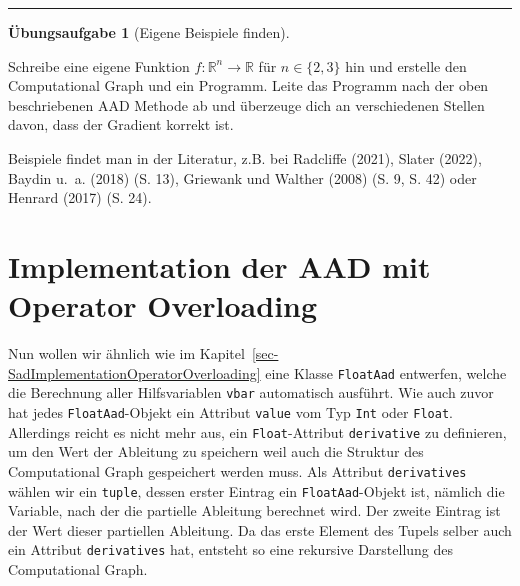 \documentclass[
  a4paper,
  DIV=11]{scrreprt}
\theoremstyle{definition}
\newtheorem{exercise}{Übungsaufgabe}[chapter]
\theoremstyle{definition}
\theoremstyle{remark}
\begin{document}
\begin{center}\rule{0.5\linewidth}{0.5pt}\end{center}

\begin{exercise}[Eigene Beispiele
finden]\protect\hypertarget{exr-EigeneAADBeispiele1}{}\label{exr-EigeneAADBeispiele1}

Schreibe eine eigene Funktion
\(f : \mathbb{R}^n \rightarrow \mathbb{R}\) für
\(n\in\lbrace 2, 3 \rbrace\) hin und erstelle den Computational Graph
und ein Programm. Leite das Programm nach der oben beschriebenen AAD
Methode ab und überzeuge dich an verschiedenen Stellen davon, dass der
Gradient korrekt ist.

\end{exercise}

\begin{tcolorbox}[enhanced jigsaw, titlerule=0mm, title=\textcolor{quarto-callout-tip-color}{\faLightbulb}\hspace{0.5em}{Lösung}, breakable, coltitle=black, leftrule=.75mm, bottomrule=.15mm, colback=white, rightrule=.15mm, opacitybacktitle=0.6, bottomtitle=1mm, toptitle=1mm, left=2mm, toprule=.15mm, colbacktitle=quarto-callout-tip-color!10!white, colframe=quarto-callout-tip-color-frame, arc=.35mm, opacityback=0]

Beispiele findet man in der Literatur, z.B. bei Radcliffe (2021), Slater
(2022), Baydin u.~a. (2018) (S. 13), Griewank und Walther (2008) (S. 9,
S. 42) oder Henrard (2017) (S. 24).

\end{tcolorbox}

\hypertarget{sec-AADmitOperatorOverloading}{%
\section{Implementation der AAD mit Operator
Overloading}\label{sec-AADmitOperatorOverloading}}

Nun wollen wir ähnlich wie im
Kapitel~\ref{sec-SadImplementationOperatorOverloading} eine Klasse
\texttt{FloatAad} entwerfen, welche die Berechnung aller Hilfsvariablen
\texttt{vbar} automatisch ausführt. Wie auch zuvor hat jedes
\texttt{FloatAad}-Objekt ein Attribut \texttt{value} vom Typ
\texttt{Int} oder \texttt{Float}. Allerdings reicht es nicht mehr aus,
ein \texttt{Float}-Attribut \texttt{derivative} zu definieren, um den
Wert der Ableitung zu speichern weil auch die Struktur des Computational
Graph gespeichert werden muss. Als Attribut \texttt{derivatives} wählen
wir ein \texttt{tuple}, dessen erster Eintrag ein
\texttt{FloatAad}-Objekt ist, nämlich die Variable, nach der die
partielle Ableitung berechnet wird. Der zweite Eintrag ist der Wert
dieser partiellen Ableitung. Da das erste Element des Tupels selber auch
ein Attribut \texttt{derivatives} hat, entsteht so eine rekursive
Darstellung des Computational Graph.
\end{document}
